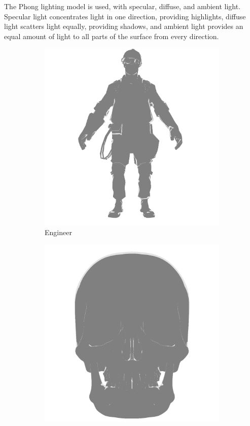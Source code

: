 The Phong lighting model is used, with specular, diffuse, and ambient light. Specular light concentrates light in one direction, providing highlights, diffuse light scatters light equally, providing shadows, and ambient light provides an equal amount of light to all parts of the surface from every direction. 

\begin{figure}[h]
    \centering
    \begin{subfigure}[b]{0.31\textwidth}
    \includegraphics[width=\textwidth]{img/Lighting/Rim.png}
    \caption{Engineer}
    \label{fig:Rim}
    \end{subfigure}
    \centering
    \begin{subfigure}[b]{0.31\textwidth}
    \includegraphics[width=\textwidth]{img/Lighting/RimSkull.png}

\end{subfigure}
\end{figure}
